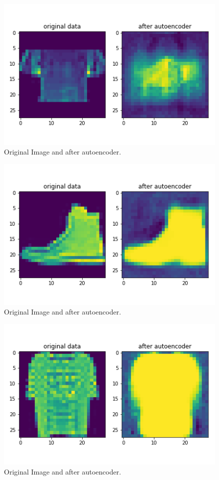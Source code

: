 \documentclass[11pt,a4paper,oneside]{article}
\begin{document}
\begin{figure}[!btp]
	\centering
	\includegraphics[width=\textwidth]{figures/save_ev_3}
	\caption{Original Image and after autoencoder.}
\end{figure}
\begin{figure}[!btp]
	\centering
	\includegraphics[width=\textwidth]{figures/save_ev_4}
	\caption{Original Image and after autoencoder.}
\end{figure}
\begin{figure}[!btp]
	\centering
	\includegraphics[width=\textwidth]{figures/save_ev_5}
	\caption{Original Image and after autoencoder.}
\end{figure}
\end{document}

